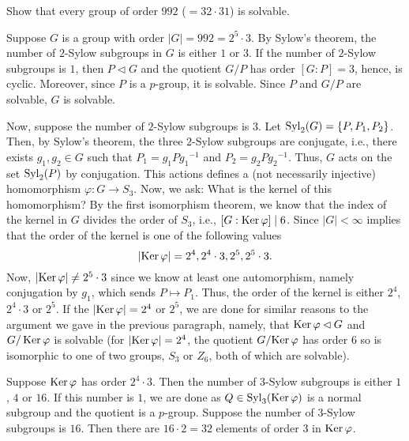 \begin{problem}
  Show that every group of order $992$ ($=32\cdot 31$) is solvable.
\end{problem}
\begin{solution}
  Suppose $G$ is a group with order $|G|=992=2^5\cdot 3$. By Sylow's
  theorem, the number of $2$-Sylow subgroups in $G$ is either $1$ or
  $3$. If the number of $2$-Sylow subgroups is $1$, then $P\lhd G$ and the
  quotient $G/P$ has order $[G:P]=3$, hence, is cyclic. Moreover, since $P$
  is a $p$-group, it is solvable. Since $P$ and $G/P$ are solvable, $G$ is
  solvable.

  Now, suppose the number of $2$-Sylow subgroups is $3$. Let
  $\operatorname{Syl}_2(G)=\{P,P_1,P_2\}$. Then, by Sylow's theorem, the three
  $2$-Sylow subgroups are conjugate, i.e., there exists $g_1,g_2\in G$ such
  that $P_1=g_1P{g_1}^{-1}$ and $P_2=g_2P{g_2}^{-1}$. Thus, $G$ acts on the
  set $\operatorname{Syl}_2(P)$ by conjugation. This actions defines a (not necessarily
  injective) homomorphism $\varphi\colon G\to S_3$. Now, we ask: What is
  the kernel of this homomorphism? By the first isomorphism theorem, we
  know that the index of the kernel in $G$ divides the order of $S_3$,
  i.e., $[G:{\operatorname{Ker}\varphi}]\mid 6$. Since $|G|<\infty$ implies that the
  order of the kernel is one of the following values
  \[
    |{\operatorname{Ker}\varphi}|=2^4,2^4\cdot 3,2^5,2^5\cdot 3.
  \]
  Now, $|{\operatorname{Ker}\varphi}|\neq 2^5\cdot 3$ since we know at least one
  automorphism, namely conjugation by $g_1$, which sends $P\mapsto
  P_1$. Thus, the order of the kernel is either $2^4$, $2^4\cdot 3$ or
  $2^5$. If the $|{\operatorname{Ker}\varphi}|=2^4$ or $2^5$, we are done for similar
  reasons to the argument we gave in the previous paragraph, namely, that
  $\operatorname{Ker}\varphi\lhd G$ and $G/\operatorname{Ker}\varphi$ is solvable (for
  $|{\operatorname{Ker}\varphi}|=2^4$, the quotient $G/{\operatorname{Ker}\varphi}$ has order $6$ so is
  isomorphic to one of two groups, $S_3$ or $Z_6$, both of which are
  solvable).

  Suppose $\operatorname{Ker}\varphi$ has order $2^4\cdot 3$. Then the number of
  $3$-Sylow subgroups is either $1$, $4$ or $16$. If this number is $1$, we
  are done as $Q\in \operatorname{Syl}_3({\operatorname{Ker}\varphi})$ is a normal subgroup and the
  quotient is a $p$-group. Suppose the number of $3$-Sylow subgroups is
  $16$. Then there are $16\cdot 2=32$ elements of order $3$ in
  $\operatorname{Ker}\varphi$.
\end{solution}

